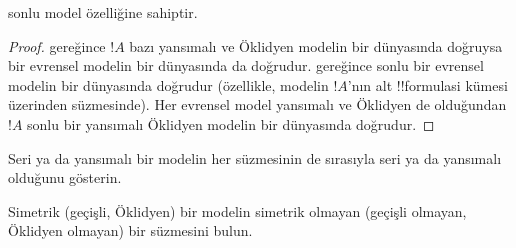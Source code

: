 \begin{cor}
   sonlu model özelliğine sahiptir.
\end{cor}

\begin{proof}
   gereğince $!A$ bazı yansımalı ve Öklidyen
  modelin bir dünyasında doğruysa bir evrensel modelin bir dünyasında da
  doğrudur.  gereğince sonlu bir evrensel modelin bir
  dünyasında doğrudur (özellikle, modelin $!A$'nın alt !!{formula}s{}i kümesi
  üzerinden süzmesinde). Her evrensel model yansımalı ve Öklidyen de
  olduğundan $!A$ sonlu bir yansımalı Öklidyen modelin bir dünyasında
  doğrudur.
\end{proof}

\begin{prob}
  Seri ya da yansımalı bir modelin her süzmesinin de sırasıyla seri ya da
  yansımalı olduğunu gösterin.
\end{prob}

\begin{prob}
  Simetrik (geçişli, Öklidyen) bir modelin simetrik olmayan (geçişli olmayan,
  Öklidyen olmayan) bir süzmesini bulun.
\end{prob}

